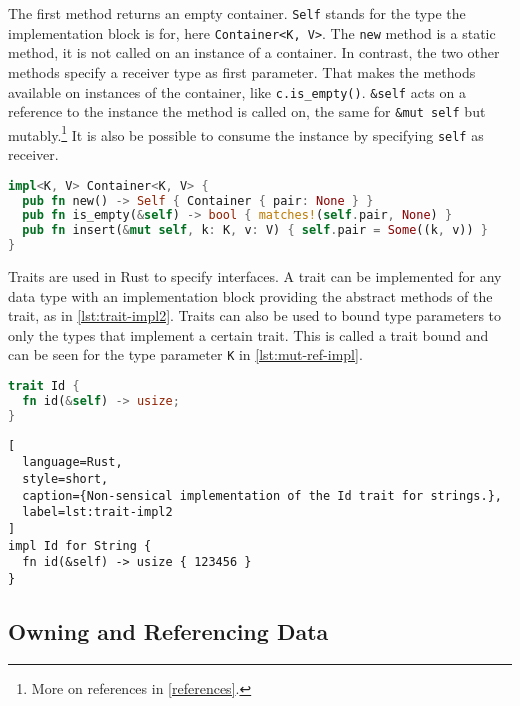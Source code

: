 The first method returns an empty container. \lstinline!Self! stands for the
type the implementation block is for, here \lstinline!Container<K, V>!. The
\lstinline!new! method is a static method, it is not called on an instance of a
container. In contrast, the two other methods specify a receiver type as first
parameter. That makes the methods available on instances of the container, like
\lstinline!c.is_empty()!. \lstinline!&self! acts on a reference to the instance
the method is called on, the same for \lstinline!&mut self! but
mutably.\footnote{More on references in \autoref{references}.} It is also be
possible to consume the instance by specifying \lstinline!self! as receiver.

\begin{lstlisting}[language=Rust, caption={Methods for the running example}, label=lst:impl1]
impl<K, V> Container<K, V> {
  pub fn new() -> Self { Container { pair: None } }
  pub fn is_empty(&self) -> bool { matches!(self.pair, None) }
  pub fn insert(&mut self, k: K, v: V) { self.pair = Some((k, v)) }
}
\end{lstlisting}

Traits are used in Rust to specify interfaces. A trait can be implemented for
any  data type with an implementation block providing the abstract methods of
the trait, as in \autoref{lst:trait-impl2}. Traits can also be used to bound
type parameters to only the types that implement a certain trait. This is called
a trait bound and can be seen for the type parameter \lstinline!K! in
\autoref{lst:mut-ref-impl}.

\noindent\begin{minipage}[t]{.45\textwidth}
\begin{lstlisting}[language=Rust, style=short, caption={Rust trait with one method.}, label=lst:trait-impl1]
trait Id {
  fn id(&self) -> usize;
}
\end{lstlisting}
\end{minipage}\hfill
\begin{minipage}[t]{.45\textwidth}
\begin{lstlisting}[
  language=Rust,
  style=short,
  caption={Non-sensical implementation of the Id trait for strings.},
  label=lst:trait-impl2
]
impl Id for String {
  fn id(&self) -> usize { 123456 }
}
\end{lstlisting}
\end{minipage}

\subsection{Owning and Referencing Data}

